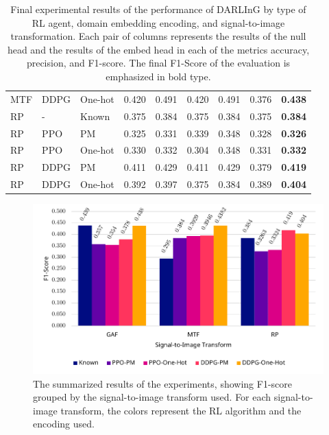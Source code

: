 \begin{table}[]
{\begin{tabular}{@{}lllrrrrrr@{}}
		MTF                  & DDPG                 & One-hot              & 0.420        & 0.491         & 0.420         & 0.491         & 0.376        & \textbf{0.438}         \\
		RP                   & -                    & Known                & 0.375        & 0.384         & 0.375         & 0.384         & 0.375        & \textbf{0.384}         \\
		RP                   & PPO                  & PM                   & 0.325        & 0.331         & 0.339         & 0.348         & 0.328        & \textbf{0.326}         \\
		RP                   & PPO                  & One-hot              & 0.330        & 0.332         & 0.304         & 0.348         & 0.331        & \textbf{0.332}         \\
		RP                   & DDPG                 & PM                   & 0.411        & 0.429         & 0.411         & 0.429         & 0.379        & \textbf{0.419}         \\
		RP                   & DDPG                 & One-hot              & 0.392        & 0.397         & 0.375         & 0.384         & 0.389        & \textbf{0.404}         \\ \bottomrule
	\end{tabular}
	}
	\caption{Final experimental results of the performance of DARLInG by type of RL agent, domain embedding encoding, and signal-to-image transformation. Each pair of columns represents the results of the null head and the results of the embed head in each of the metrics accuracy, precision, and F1-score. The final F1-Score of the evaluation is emphasized in bold type.}
	\label{tab:final-results}
\end{table}

\begin{figure}
	\centering
	\includegraphics[width=6in]{figures/results_main}
	\caption{The summarized results of the experiments, showing F1-score grouped by the signal-to-image transform used. For each signal-to-image transform, the colors represent the RL algorithm and the encoding used.}
	\label{fig:results-main}
\end{figure}

